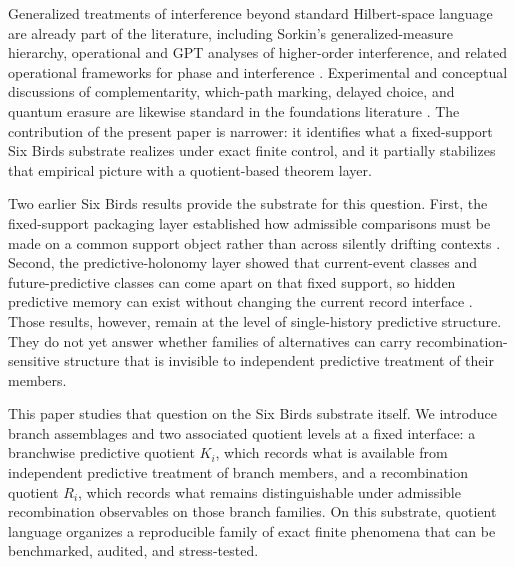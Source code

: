 \documentclass[11pt]{article}
\theoremstyle{definition}
\begin{document}
Generalized treatments of interference beyond standard Hilbert-space language are already part of the literature, including Sorkin's generalized-measure hierarchy, operational and GPT analyses of higher-order interference, and related operational frameworks for phase and interference \cite{Sorkin1994QuantumMeasure,Barrett2007GPT,BarnumMuellerUdudec2014HigherOrder,LeeSelby2017HigherOrder,DakicPaterekBrukner2014DensityCubes,GarnerEtAl2013PhaseInterference,Plavala2023GPTIntro,ChiribellaDarianoPerinotti2011InformationalDerivation}. Experimental and conceptual discussions of complementarity, which-path marking, delayed choice, and quantum erasure are likewise standard in the foundations literature \cite{WoottersZurek1979Complementarity,GreenbergerYasin1988WaveParticle,Englert1996VisibilityWhichWay,ScullyDruhl1982QuantumEraser,JacquesEtAl2007WheelerDelayedChoice,KimEtAl2000DelayedChoiceEraser,WalbornEtAl2002DoubleSlitQuantumEraser,MaKoflerZeilinger2016DelayedChoice}. The contribution of the present paper is narrower: it identifies what a fixed-support Six Birds substrate realizes under exact finite control, and it partially stabilizes that empirical picture with a quotient-based theorem layer.

Two earlier Six Birds results provide the substrate for this question. First, the fixed-support packaging layer established how admissible comparisons must be made on a common support object rather than across silently drifting contexts \cite{Tsiokos2026EventPackages}. Second, the predictive-holonomy layer showed that current-event classes and future-predictive classes can come apart on that fixed support, so hidden predictive memory can exist without changing the current record interface \cite{Tsiokos2026RouteTransport}.
Those results, however, remain at the level of single-history predictive structure. They do not yet answer whether families of alternatives can carry recombination-sensitive structure that is invisible to independent predictive treatment of their members.

This paper studies that question on the Six Birds substrate itself. We introduce branch assemblages and two associated quotient levels at a fixed interface: a branchwise predictive quotient $K_i$, which records what is available from independent predictive treatment of branch members, and a recombination quotient $R_i$, which records what remains distinguishable under admissible recombination observables on those branch families. On this substrate, quotient language organizes a reproducible family of exact finite phenomena that can be benchmarked, audited, and stress-tested.
\end{document}
